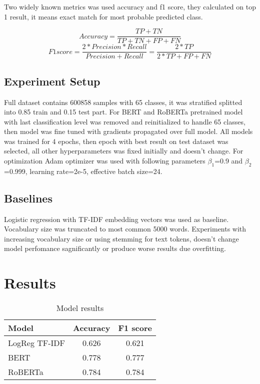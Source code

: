 \documentclass{article}
\begin{document}
Two widely known metrics was used accuracy and f1 score, they calculated on top 1 result, it means exact match for most probable predicted class.

\[
Accuracy = \frac{TP+TN}{TP+TN+FP+FN}
\]
\[
F1 score = \frac{2*Precision*Recall}{Precision+Recall} = \frac{2*TP}{2*TP+FP+FN}
\]

\subsection{Experiment Setup}

Full dataset contains 600858 samples with 65 classes, it was stratified splitted into 0.85 train and 0.15 test part. For BERT and RoBERTa pretrained model with last classification level was removed and reinitialized to handle 65 classes, then model was fine tuned with gradients propagated over full model. All models was trained for 4 epochs, then epoch with best result on test dataset was selected, all other hyperparameters was fixed initially and doesn't change. 
For optimization Adam optimizer was used with following parameters $\beta_{1}$=0.9 and $\beta_{2}$=0.999, learning rate=2e-5, effective batch size=24. 


\subsection{Baselines}

Logistic regression with TF-IDF embedding vectors was used as baseline. Vocabulary size was truncated to most common 5000 words. Experiments with increasing vocabulary size or using stemming for text tokens, doesn't change model perfomance sagnificantly or produce worse results due overfitting.

\section{Results}

\begin{table}[!tbh]
    \centering
    \begin{tabular}{|l|c|c|}
\hline
Model & Accuracy & F1 score \\
\hline
LogReg TF-IDF & 0.626 & 0.621 \\
BERT & 0.778 & 0.777 \\
RoBERTa & 0.784 & 0.784 \\
\hline
    \end{tabular}
    \caption{Model results}
    \label{tab:results}
\end{table}
\end{document}
